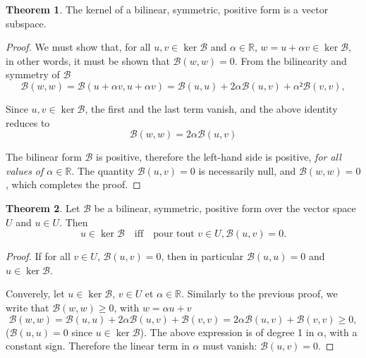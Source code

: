 \documentclass[12pt, final]{scrartcl}
\theoremstyle{definition}
\newtheorem{theorem}{Theorem}
\newcommand{\reals}{\mathbb{R}}
\begin{document}
\begin{theorem}
  The kernel of a bilinear, symmetric, positive form is a vector subspace.
\end{theorem}
\begin{proof}
  We must show that, for all $u, v ∈\ker \mathcal{B}$ and $α ∈ \reals$,
  $w = u + α v ∈ \ker \mathcal{B}$, in other words, it must be shown that
  $\mathcal{B}(w, w) = 0$. From the bilinearity and symmetry of
  $\mathcal{B}$
 \begin{equation*}
   \mathcal{B}(w, w) = \mathcal{B}(u + α v, u + α v)
   = \mathcal{B}(u, u) + 2 α \mathcal{B}(u, v) + α² \mathcal{B}(v, v),
 \end{equation*}

 Since $u, v ∈ \ker\mathcal{B}$, the first and the last term vanish, and the above identity reduces to
 \begin{equation*}
   \mathcal{B}(w, w) = 2α \mathcal{B}(u, v)
 \end{equation*}

 The bilinear form $\mathcal{B}$ is positive, therefore the left-hand side is
 positive, \emph{for all values of $α ∈ \reals$}. The quantity
 $\mathcal{B}(u, v) = 0$ is necessarily null, and $\mathcal{B}(w, w) = 0$,
 which completes the proof.
\end{proof}

\begin{theorem}
  Let $\mathcal{B}$ be a bilinear, symmetric, positive form over the vector space $U$ and $u ∈ U$. Then
 \begin{equation*}
  u ∈ \ker\mathcal{B} \quad \text{iff} \quad \text{pour tout } v ∈ U, \mathcal{B}(u, v) = 0.
 \end{equation*}
\end{theorem}

\begin{proof}
  If for all $v ∈ U$, $\mathcal{B}(u, v) = 0$, then in particular
  $\mathcal{B}(u, u) = 0$ and $u ∈ \ker \mathcal{B}$.

  Converely, let $u ∈ \ker \mathcal{B}$, $v ∈ U$ et $α ∈
  \reals$. Similarly to the previous proof, we write that
  $\mathcal{B}(w, w) ≥ 0$, with $w = α u + v$
  \begin{equation*}
    \mathcal{B}(w, w) = \mathcal{B}(u, u) + 2 α \mathcal{B}(u, v) +\mathcal{B}(v, v) = 2 α \mathcal{B}(u, v) +\mathcal{B}(v, v) ≥ 0,
  \end{equation*}
  ($\mathcal{B}(u, u) = 0$ since $u ∈ \ker \mathcal{B}$). The above
  expression is of degree 1 in $α$, with a constant sign. Therefore the linear
  term in $α$ must vanish: $\mathcal{B}(u, v) = 0$.
\end{proof}
\end{document}
